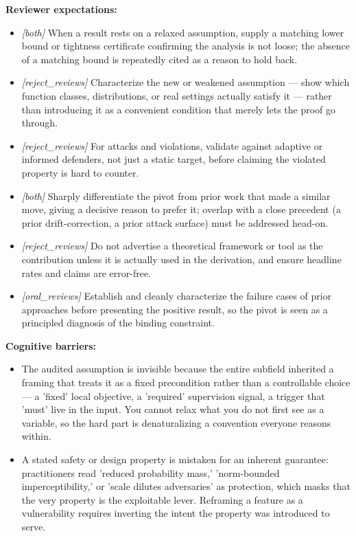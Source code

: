 \begin{tcolorbox}
\textbf{Reviewer expectations:}
\begin{itemize}[leftmargin=12pt,topsep=2pt,itemsep=1pt]
  \item \textit{[both]} When a result rests on a relaxed assumption, supply a matching lower bound or tightness certificate confirming the analysis is not loose; the absence of a matching bound is repeatedly cited as a reason to hold back.
  \item \textit{[reject\_reviews]} Characterize the new or weakened assumption --- show which function classes, distributions, or real settings actually satisfy it --- rather than introducing it as a convenient condition that merely lets the proof go through.
  \item \textit{[reject\_reviews]} For attacks and violations, validate against adaptive or informed defenders, not just a static target, before claiming the violated property is hard to counter.
  \item \textit{[both]} Sharply differentiate the pivot from prior work that made a similar move, giving a decisive reason to prefer it; overlap with a close precedent (a prior drift-correction, a prior attack surface) must be addressed head-on.
  \item \textit{[reject\_reviews]} Do not advertise a theoretical framework or tool as the contribution unless it is actually used in the derivation, and ensure headline rates and claims are error-free.
  \item \textit{[oral\_reviews]} Establish and cleanly characterize the failure cases of prior approaches before presenting the positive result, so the pivot is seen as a principled diagnosis of the binding constraint.
\end{itemize}
\textbf{Cognitive barriers:}
\begin{itemize}[leftmargin=12pt,topsep=2pt,itemsep=1pt]
  \item The audited assumption is invisible because the entire subfield inherited a framing that treats it as a fixed precondition rather than a controllable choice --- a 'fixed' local objective, a 'required' supervision signal, a trigger that 'must' live in the input. You cannot relax what you do not first see as a variable, so the hard part is denaturalizing a convention everyone reasons within.
  \item A stated safety or design property is mistaken for an inherent guarantee: practitioners read 'reduced probability mass,' 'norm-bounded imperceptibility,' or 'scale dilutes adversaries' as protection, which masks that the very property is the exploitable lever. Reframing a feature as a vulnerability requires inverting the intent the property was introduced to serve.

\end{itemize}
\end{tcolorbox}
